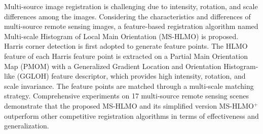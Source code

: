Multi-source image registration is challenging due to intensity, rotation, and scale differences among the images. Considering the characteristics and differences of multi-source remote sensing images, a feature-based registration algorithm named Multi-scale Histogram of Local Main Orientation (MS-HLMO) is proposed. Harris corner detection is first adopted to generate feature points. The HLMO feature of each Harris feature point is extracted on a Partial Main Orientation Map (PMOM) with a Generalized Gradient Location and Orientation Histogram-like (GGLOH) feature descriptor, which provides high intensity, rotation, and scale invariance. The feature points are matched through a multi-scale matching strategy. Comprehensive experiments on 17 multi-source remote sensing scenes demonstrate that the proposed MS-HLMO and its simplified version MS-HLMO$^+$ outperform other competitive registration algorithms in terms of effectiveness and generalization.